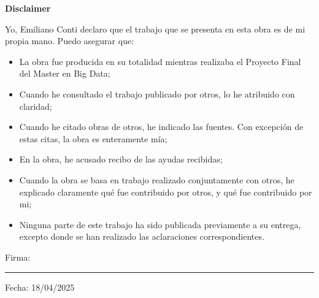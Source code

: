 \begin{center}
    \Large\bfseries Disclaimer
\end{center}
\vspace{1cm}

\noindent Yo, Emiliano Conti declaro que el trabajo que se presenta en esta obra es de mi propia mano. Puedo asegurar que:

\begin{itemize}
    \item La obra fue producida en su totalidad mientras realizaba el Proyecto Final del Master en Big Data;
    \item Cuando he consultado el trabajo publicado por otros, lo he atribuido con claridad;
    \item Cuando he citado obras de otros, he indicado las fuentes. Con excepci\'on de estas citas, la obra es enteramente m\'ia;
    \item En la obra, he acusado recibo de las ayudas recibidas;
    \item Cuando la obra se basa en trabajo realizado conjuntamente con otros, he explicado claramente qu\'e fue contribuido por otros, y qu\'e fue contribuido por mi;
    \item Ninguna parte de este trabajo ha sido publicada previamente a su entrega, excepto donde se han realizado las aclaraciones correspondientes.
\end{itemize}

\vspace{2cm}

\noindent Firma: \rule{5cm}{0.1pt}

\vspace{1cm}

\noindent Fecha: 18/04/2025
\newpage